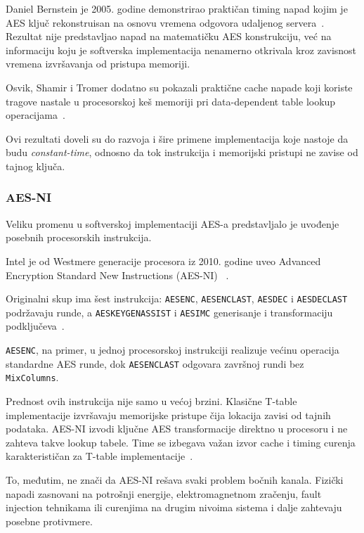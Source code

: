 Daniel Bernstein je 2005. godine demonstrirao praktičan timing napad
kojim je AES ključ rekonstruisan na osnovu vremena odgovora udaljenog
servera~\cite{bernstein-cache-timing-2005}. Rezultat nije predstavljao
napad na matematičku AES konstrukciju, već na informaciju koju je
softverska implementacija nenamerno otkrivala kroz zavisnost vremena
izvršavanja od pristupa memoriji.

Osvik, Shamir i Tromer dodatno su pokazali praktične cache napade koji
koriste tragove nastale u procesorskoj keš memoriji pri data-dependent
table lookup operacijama~\cite{osvik-shamir-tromer-2006}.

Ovi rezultati doveli su do razvoja i šire primene implementacija koje
nastoje da budu \emph{constant-time}, odnosno da tok instrukcija i
memorijski pristupi ne zavise od tajnog ključa.


\subsubsection{AES-NI}

Veliku promenu u softverskoj implementaciji AES-a predstavljalo je
uvođenje posebnih procesorskih instrukcija.

Intel je od Westmere generacije procesora iz 2010. godine uveo
Advanced Encryption Standard New Instructions (AES-NI)
~\cite{intel-aes-ni}.

Originalni skup ima šest instrukcija: \texttt{AESENC},
\texttt{AESENCLAST}, \texttt{AESDEC} i \texttt{AESDECLAST} podržavaju
runde, a \texttt{AESKEYGENASSIST} i \texttt{AESIMC} generisanje i
transformaciju podključeva~\cite{intel-aes-ni}.

\texttt{AESENC}, na primer, u jednoj procesorskoj instrukciji
realizuje većinu operacija standardne AES runde, dok
\texttt{AESENCLAST} odgovara završnoj rundi bez
\texttt{MixColumns}.

Prednost ovih instrukcija nije samo u većoj brzini. Klasične
T-table implementacije izvršavaju memorijske pristupe čija lokacija
zavisi od tajnih podataka. AES-NI izvodi ključne AES transformacije
direktno u procesoru i ne zahteva takve lookup tabele.
Time se izbegava važan izvor cache i timing curenja karakterističan
za T-table implementacije~\cite{intel-aes-ni}.

To, međutim, ne znači da AES-NI rešava svaki problem bočnih kanala.
Fizički napadi zasnovani na potrošnji energije, elektromagnetnom
zračenju, fault injection tehnikama ili curenjima na drugim nivoima
sistema i dalje zahtevaju posebne protivmere.


